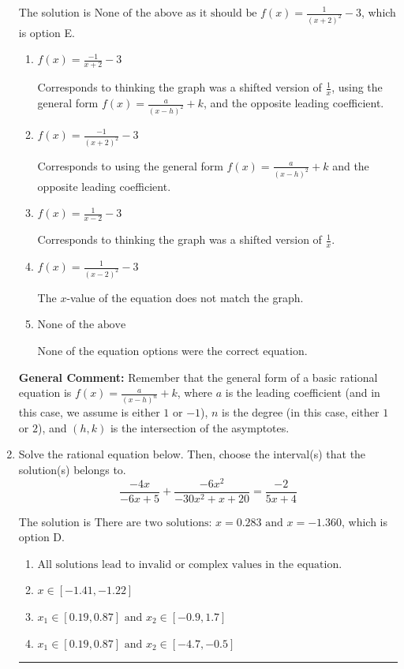 \documentclass{extbook}[14pt]
\newcommand{\litem}[1]{\item #1

\rule{\textwidth}{0.4pt}}
\begin{document}
\begin{enumerate}
{The solution is \( \text{None of the above as it should be } f(x) = \frac{1}{(x + 2)^2} - 3 \), which is option E.\begin{enumerate}[label=\Alph*.]
\item \( f(x) = \frac{-1}{x + 2} - 3 \)

Corresponds to thinking the graph was a shifted version of $\frac{1}{x}$, using the general form $f(x) = \frac{a}{(x-h)^2}+k$, and the opposite leading coefficient.
\item \( f(x) = \frac{-1}{(x + 2)^2} - 3 \)

Corresponds to using the general form $f(x) = \frac{a}{(x-h)^2}+k$ and the opposite leading coefficient.
\item \( f(x) = \frac{1}{x - 2} - 3 \)

Corresponds to thinking the graph was a shifted version of $\frac{1}{x}$.
\item \( f(x) = \frac{1}{(x - 2)^2} - 3 \)

The $x$-value of the equation does not match the graph.
\item \( \text{None of the above} \)

None of the equation options were the correct equation.
\end{enumerate}

\textbf{General Comment:} Remember that the general form of a basic rational equation is $ f(x) = \frac{a}{(x-h)^n} + k$, where $a$ is the leading coefficient (and in this case, we assume is either $1$ or $-1$), $n$ is the degree (in this case, either $1$ or $2$), and $(h, k)$ is the intersection of the asymptotes.
}
\litem{
Solve the rational equation below. Then, choose the interval(s) that the solution(s) belongs to.
\[ \frac{-4x}{-6x + 5} + \frac{-6x^{2}}{-30x^{2} +x + 20} = \frac{-2}{5x + 4} \]

The solution is \( \text{There are two solutions: } x = 0.283 \text{ and } x = -1.360 \), which is option D.\begin{enumerate}[label=\Alph*.]
\item \( \text{All solutions lead to invalid or complex values in the equation.} \)


\item \( x \in [-1.41,-1.22] \)


\item \( x_1 \in [0.19, 0.87] \text{ and } x_2 \in [-0.9,1.7] \)


\item \( x_1 \in [0.19, 0.87] \text{ and } x_2 \in [-4.7,-0.5] \)


\end{enumerate}}
\end{enumerate}
\end{document}
